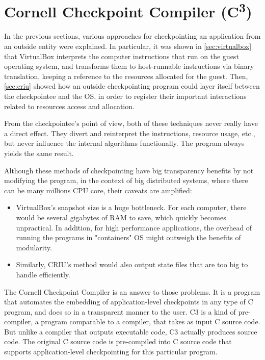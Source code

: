 \section{Cornell Checkpoint Compiler (C\textsuperscript{3})}\label{sec:c3}
In the previous sections, various approaches for checkpointing an application from an outside entity were explained. In particular, it was shown in \autoref{sec:virtualbox} that VirtualBox interprets the computer instructions that run on the guest operating system, and transforms them to host-runnable instructions via binary translation, keeping a reference to the resources allocated for the guest. 
Then, \autoref{sec:criu} showed how an outside checkpointing program could layer itself between the checkpointee and the OS, in order to register their important interactions related to resources access and allocation. 

From the checkpointee's point of view, both of these techniques never really have a direct effect. They divert and reinterpret the instructions, resource usage, etc., but never influence the internal algorithms functionally. The program always yields the same result.

Although these methods of checkpointing have big transparency benefits by not modifying the program, in the context of big distributed systems, where there can be many millions CPU core, their caveats are amplified:
\begin{itemize}
	\item VirtualBox's snapshot size is a huge bottleneck. For each computer, there would be several gigabytes of RAM to save, which quickly becomes unpractical. In addition, for high performance applications, the overhead of running the programs in "containers" OS might outweigh the benefits of modularity.
	\item Similarly, CRIU's method would also output state files that are too big to handle efficiently. 
\end{itemize} 

The Cornell Checkpoint Compiler is an answer to those problems. It is a program that automates the embedding of application-level checkpoints in any type of C program, and does so in a transparent manner to the user. C3 is a kind of pre-compiler, a program comparable to a compiler, that takes as input C source code. But unlike a compiler that outputs executable code, C3 actually produces source code. The original C source code is pre-compiled into C source code that supports application-level checkpointing for this particular program.

